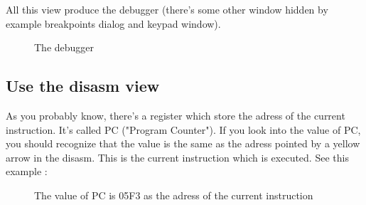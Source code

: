 \documentclass[10pt]{report}
\begin{document}
All this view produce the debugger (there's some other window hidden by example breakpoints dialog and keypad window).\newline
\begin{figure}[H]
\centering
{}
\caption{The debugger}
\end{figure}

\subsection{Use the disasm view}

As you probably know, there's a register which store the adress of the current instruction.\newline
It's called PC ("Program Counter").\newline
If you look into the value of PC, you should recognize that the value is the same as the adress pointed by a yellow arrow in the disasm.\newline 
This is the current instruction which is executed.\newline
See this example :\newline
\begin{figure}[H]
\centering
{}
\caption{The value of PC is 05F3 as the adress of the current instruction}
\end{figure}
\end{document}
